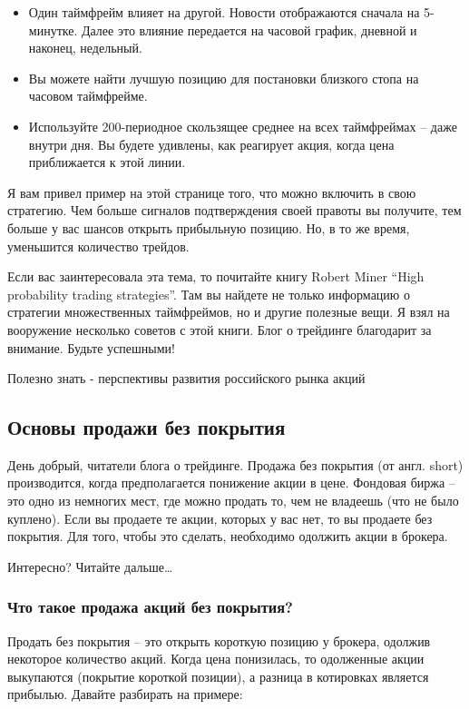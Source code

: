 \documentclass{book}
\begin{document}
\begin{itemize}
\item     Один таймфрейм влияет на другой. Новости отображаются сначала на 5-минутке. Далее это влияние передается на часовой график, дневной и наконец, недельный.
\item     Вы можете найти лучшую позицию для постановки близкого стопа на часовом таймфрейме.
\item     Используйте 200-периодное скользящее среднее на всех таймфреймах – даже внутри дня. Вы будете удивлены, как реагирует акция, когда цена приближается к этой линии.
\end{itemize}

Я вам привел пример на этой странице того, что можно включить в свою стратегию. Чем больше сигналов подтверждения своей правоты вы получите, тем больше у вас шансов открыть прибыльную позицию. Но, в то же время, уменьшится количество трейдов.

Если вас заинтересовала эта тема, то почитайте книгу Robert Miner “High probability trading strategies”. Там вы найдете не только информацию о стратегии множественных таймфреймов, но и другие полезные вещи. Я взял на вооружение несколько советов с этой книги. Блог о трейдинге благодарит за внимание. Будьте успешными!


Полезно знать - перспективы развития российского рынка акций

\subsection{Основы продажи без покрытия}

День добрый, читатели блога о трейдинге. Продажа без покрытия (от англ. short) производится, когда предполагается понижение акции в цене. Фондовая биржа – это одно из немногих мест, где можно продать то, чем не владеешь (что не было куплено). Если вы продаете те акции, которых у вас нет, то вы продаете без покрытия. Для того, чтобы это сделать, необходимо одолжить акции в брокера.

Интересно? Читайте дальше…

\subsubsection{Что такое продажа акций без покрытия?}

Продать без покрытия – это открыть короткую позицию у брокера, одолжив некоторое количество акций. Когда цена понизилась, то одолженные акции выкупаются (покрытие короткой позиции), а разница в котировках является прибылью. Давайте разбирать на примере:
\end{document}
